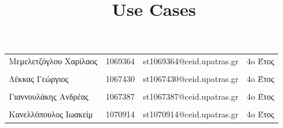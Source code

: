 \documentclass{../ol-softwaremanual}
\begin{document}
	
	
	\begin{titlepage}
		
		
		\title{\en Use Cases \\}
		
	\end{titlepage}
	
	
	\maketitle
	
	\newpage
	
	
	\vspace{20pt}
	
	
	
	\begin{table}[htbp!]
		
		\begin{tabular}{llll}
			Μεμελετζόγλου Χαρίλαος & 1069364 & \en st1069364@ceid.upatras.gr & 4o Έτος   \\ 
			\\ Λέκκας Γεώργιος      &      1067430    &   \en st1067430@ceid.upatras.gr & 4o Έτος  \\
			\\ Γιαννουλάκης Ανδρέας        &   1067387       & \en st1067387@ceid.upatras.gr & 4o Έτος           \\
			\\ Κανελλόπουλος Ιωακείμ        &  1070914        &    \en st1070914@ceid.upatras.gr & 4o Έτος        \\ 
		\end{tabular}
	\end{table}
	
\end{document}
